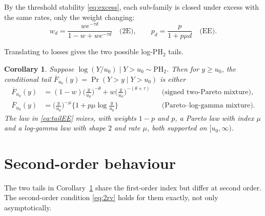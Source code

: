 \documentclass[12pt]{article}
\newtheorem{corollary}[theorem]{Corollary}
\theoremstyle{definition}
\theoremstyle{remark}
\newcommand{\bF}{\overline{F}}
\newcommand{\PH}{\mathrm{PH}}
\begin{document}
By the threshold stability \eqref{eq:excess}, each sub-family is closed under excess with the same rates, only the weight changing:
\begin{equation}\label{eq:weights}
w_d=\frac{w e^{-\tau d}}{1-w+we^{-\tau d}}\quad\text{(2E)},\qquad p_d=\frac{p}{1+p\mu d}\quad\text{(EE)}.
\end{equation}

Translating to losses gives the two possible log-PH$_2$ tails.

\begin{corollary}\label{cor:tails}
Suppose $\log(Y/u_0)\mid Y>u_0\sim\PH_2$. Then for $y\ge u_0$, the conditional tail $\bF_{u_0}(y)=\Pr(Y>y\mid Y>u_0)$ is either
\begin{align}
\bF_{u_0}(y)&=(1-w)\Big(\frac{y}{u_0}\Big)^{-\theta}+w\Big(\frac{y}{u_0}\Big)^{-(\theta+\tau)} &&\text{(signed two-Pareto mixture)},\label{eq:tail2E}\\
\bF_{u_0}(y)&=\Big(\frac{y}{u_0}\Big)^{-\mu}\Big\{1+p\mu\log\frac{y}{u_0}\Big\} &&\text{(Pareto--log-gamma mixture)}.\label{eq:tailEE}
\end{align}
The law in \eqref{eq:tailEE} mixes, with weights $1-p$ and $p$, a Pareto law with index $\mu$ and a log-gamma law with shape $2$ and rate $\mu$, both supported on $[u_0,\infty)$.
\end{corollary}

\section{Second-order behaviour}\label{sec:2rv}

The two tails in Corollary~\ref{cor:tails} share the first-order index but differ at second order. The second-order condition \eqref{eq:2rv} holds for them exactly, not only asymptotically.
\end{document}
